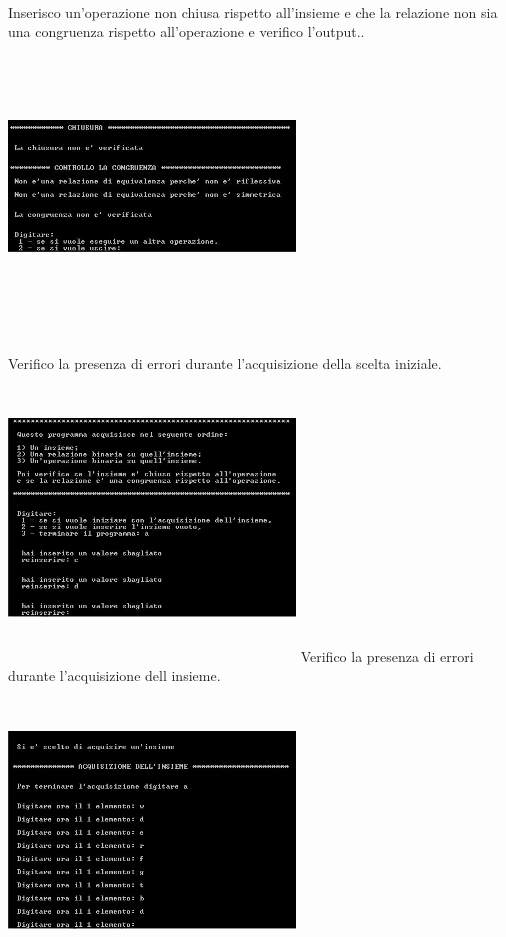 \documentclass[11pt,a4paper,titlepage,block]{article}
\begin{document}
\\
\newpage
Inserisco un'operazione non chiusa rispetto all'insieme e che la relazione non sia una congruenza rispetto all'operazione e verifico l'output..\\
\includegraphics[width=3in,height=3in,viewport=0 0 300 300]{../Screenshots/Capture9.JPG}\\
\\
Verifico la presenza di errori durante l'acquisizione della scelta iniziale.\\
\includegraphics[width=3in,height=3in,viewport=0 0 300 300]{../Screenshots/Capture10.JPG}
\newpage
Verifico la presenza di errori durante l'acquisizione dell insieme.\\
\includegraphics[width=3in,height=3in,viewport=0 0 300 300]{../Screenshots/Capture11.JPG}\\
\end{document}
